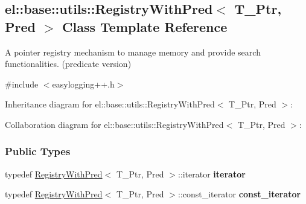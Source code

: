 \hypertarget{a00074}{}\subsection{el\+:\+:base\+:\+:utils\+:\+:Registry\+With\+Pred$<$ T\+\_\+\+Ptr, Pred $>$ Class Template Reference}
\label{a00074}


A pointer registry mechanism to manage memory and provide search functionalities. (predicate version)  




{\ttfamily \#include $<$easylogging++.\+h$>$}



Inheritance diagram for el\+:\+:base\+:\+:utils\+:\+:Registry\+With\+Pred$<$ T\+\_\+\+Ptr, Pred $>$\+:


Collaboration diagram for el\+:\+:base\+:\+:utils\+:\+:Registry\+With\+Pred$<$ T\+\_\+\+Ptr, Pred $>$\+:
\subsubsection*{Public Types}
\begin{DoxyCompactItemize}
\item 
\hypertarget{a00074_afc03d2d0a72f5ebf03e1e3b37bd9932d}{}typedef \hyperlink{a00074}{Registry\+With\+Pred}$<$ T\+\_\+\+Ptr, Pred $>$\+::iterator {\bfseries iterator}\label{a00074_afc03d2d0a72f5ebf03e1e3b37bd9932d}

\item 
\hypertarget{a00074_ad9af7a8eeedd58a75eb70bccb334f6dc}{}typedef \hyperlink{a00074}{Registry\+With\+Pred}$<$ T\+\_\+\+Ptr, Pred $>$\+::const\+\_\+iterator {\bfseries const\+\_\+iterator}\label{a00074_ad9af7a8eeedd58a75eb70bccb334f6dc}

\end{DoxyCompactItemize}
